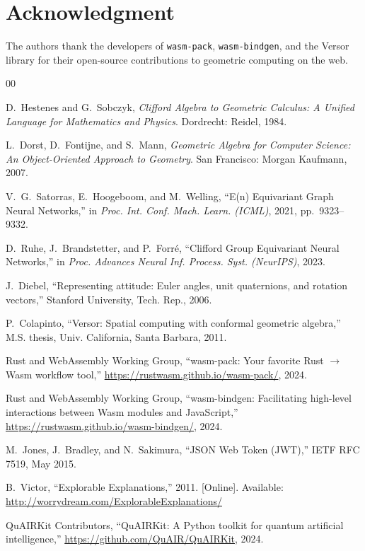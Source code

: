 \documentclass[conference]{IEEEtran}
\begin{document}
\section*{Acknowledgment}
The authors thank the developers of \texttt{wasm-pack}, \texttt{wasm-bindgen}, and the Versor library for their open-source contributions to geometric computing on the web.

\begin{thebibliography}{00}

 D.~Hestenes and G.~Sobczyk, \emph{Clifford Algebra to Geometric Calculus: A Unified Language for Mathematics and Physics}. Dordrecht: Reidel, 1984.

 L.~Dorst, D.~Fontijne, and S.~Mann, \emph{Geometric Algebra for Computer Science: An Object-Oriented Approach to Geometry}. San Francisco: Morgan Kaufmann, 2007.

 V.~G.~Satorras, E.~Hoogeboom, and M.~Welling, ``E(n) Equivariant Graph Neural Networks,'' in \emph{Proc. Int. Conf. Mach. Learn. (ICML)}, 2021, pp.~9323--9332.

 D.~Ruhe, J.~Brandstetter, and P.~Forr\'{e}, ``Clifford Group Equivariant Neural Networks,'' in \emph{Proc. Advances Neural Inf. Process. Syst. (NeurIPS)}, 2023.

 J.~Diebel, ``Representing attitude: Euler angles, unit quaternions, and rotation vectors,'' Stanford University, Tech. Rep., 2006.

 P.~Colapinto, ``Versor: Spatial computing with conformal geometric algebra,'' M.S. thesis, Univ. California, Santa Barbara, 2011.

 Rust and WebAssembly Working Group, ``wasm-pack: Your favorite Rust $\to$ Wasm workflow tool,'' \url{https://rustwasm.github.io/wasm-pack/}, 2024.

 Rust and WebAssembly Working Group, ``wasm-bindgen: Facilitating high-level interactions between Wasm modules and JavaScript,'' \url{https://rustwasm.github.io/wasm-bindgen/}, 2024.

 M.~Jones, J.~Bradley, and N.~Sakimura, ``JSON Web Token (JWT),'' IETF RFC 7519, May 2015.

 B.~Victor, ``Explorable Explanations,'' 2011. [Online]. Available: \url{http://worrydream.com/ExplorableExplanations/}

 QuAIRKit Contributors, ``QuAIRKit: A Python toolkit for quantum artificial intelligence,'' \url{https://github.com/QuAIR/QuAIRKit}, 2024.

\end{thebibliography}
\end{document}
